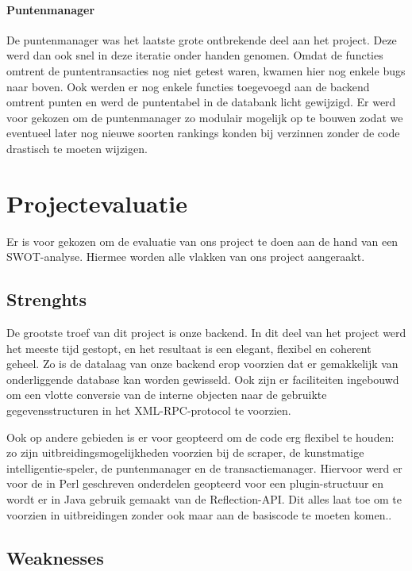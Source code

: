 \subsubsection{Puntenmanager}
De puntenmanager was het laatste grote ontbrekende deel aan het project. Deze werd dan ook snel in deze iteratie onder handen genomen. Omdat de functies omtrent de puntentransacties nog niet getest waren, kwamen hier nog enkele bugs naar boven. Ook werden er nog enkele functies toegevoegd aan de backend omtrent punten en werd de puntentabel in de databank licht gewijzigd. Er werd voor gekozen om de puntenmanager zo modulair mogelijk op te bouwen zodat we eventueel later nog nieuwe soorten rankings konden bij verzinnen zonder de code drastisch te moeten wijzigen.

\chapter{Projectevaluatie}
Er is voor gekozen om de evaluatie van ons project te doen aan de hand van een SWOT-analyse. Hiermee worden alle vlakken van ons project aangeraakt.

\section{Strenghts}

De grootste troef van dit project is onze backend. In dit deel van het project werd het meeste tijd gestopt, en het resultaat is een elegant, flexibel en coherent geheel. 
Zo is de datalaag van onze backend erop voorzien dat er gemakkelijk van onderliggende database kan worden gewisseld. Ook zijn er faciliteiten ingebouwd om een vlotte conversie van de interne objecten naar de gebruikte gegevensstructuren in het XML-RPC-protocol te voorzien.

Ook op andere gebieden is er voor geopteerd om de code erg flexibel te houden: zo zijn uitbreidingsmogelijkheden voorzien bij de scraper, de kunstmatige intelligentie-speler, de puntenmanager en de transactiemanager. Hiervoor werd er voor de in Perl geschreven onderdelen geopteerd voor een plugin-structuur en wordt er in Java gebruik gemaakt van de Reflection-API. Dit alles laat toe om te voorzien in uitbreidingen zonder ook maar aan de basiscode te moeten komen..

\section{Weaknesses}

